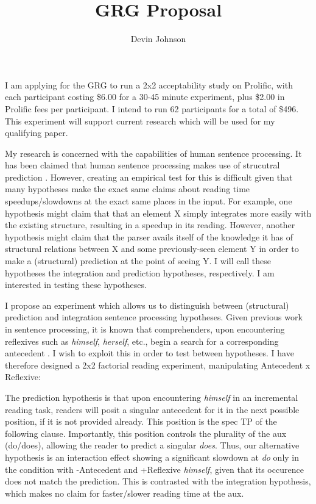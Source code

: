 \documentclass[12pt]{article}
\title{{\normalsize\bfseries {GRG Proposal}}}
\author{\normalsize {Devin Johnson}}
\date{\vspace{-10ex}}
\begin{document}
\maketitle

\vspace{5ex}

I am applying for the GRG to run a 2x2 acceptability study on Prolific, with each participant costing \$6.00 for a 30-45 minute experiment, plus \$2.00 in Prolific fees per participant. I intend to run 62 participants for a total of \$496. This experiment will support current research which will be used for my qualifying paper.

My research is concerned with the capabilities of human sentence processing. It has been claimed that human sentence processing makes use of strucutral prediction \cite{Kazanina2017,Yoshida-Dickey-Sturt2013}. However, creating an empirical test for this is difficult given that many hypotheses make the exact same claims about reading time speedups/slowdowns at the exact same places in the input. For example, one hypothesis might claim that that an element X simply integrates more easily with the existing structure, resulting in a speedup in its reading. However, another hypothesis might claim that the parser avails itself of the knowledge it has of structural relations between X and some previously-seen element Y in order to make a (structural) prediction at the point of seeing Y. I will call these hypotheses the integration and prediction hypotheses, respectively. I am interested in testing these hypotheses.

I propose an experiment which allows us to distinguish between (structural) prediction and integration sentence processing hypotheses. Given previous work in sentence processing, it is known that comprehenders, upon encountering reflexives such as \textit{himself}, \textit{herself}, etc., begin a search for a corresponding antecedent \cite{Sturt2003,Kazanina-Lau-Lieberman-Yoshida-Phillips2007}. I wish to exploit this in order to test between hypotheses. I have therefore designed a 2x2 factorial reading experiment, manipulating Antecedent x Reflexive:
\begin{exe}
\end{exe}
The prediction hypothesis is that upon encountering \textit{himself} in an incremental reading task, readers will posit a singular antecedent for it in the next possible position, if it is not provided already. This position is the spec TP of the following clause. Importantly, this position controls the plurality of the aux (do/does), allowing the reader to predict a singular \textit{does}. Thus, our alternative hypothesis is an interaction effect showing a significant slowdown at \textit{do} only in the condition with -Antecedent and +Reflexive \textit{himself}, given that its occurence does not match the prediction. This is contrasted with the integration hypothesis, which makes no claim for faster/slower reading time at the aux.
\end{document}
